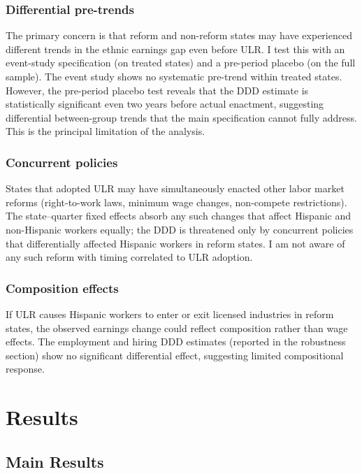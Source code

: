 \documentclass[12pt]{article}
\begin{document}
\subsubsection*{Differential pre-trends} The primary concern is that reform and non-reform states may have experienced different trends in the ethnic earnings gap even before ULR. I test this with an event-study specification (on treated states) and a pre-period placebo (on the full sample). The event study shows no systematic pre-trend within treated states. However, the pre-period placebo test reveals that the DDD estimate is statistically significant even two years before actual enactment, suggesting differential between-group trends that the main specification cannot fully address. This is the principal limitation of the analysis.

\subsubsection*{Concurrent policies} States that adopted ULR may have simultaneously enacted other labor market reforms (right-to-work laws, minimum wage changes, non-compete restrictions). The state--quarter fixed effects absorb any such changes that affect Hispanic and non-Hispanic workers equally; the DDD is threatened only by concurrent policies that differentially affected Hispanic workers in reform states. I am not aware of any such reform with timing correlated to ULR adoption.

\subsubsection*{Composition effects} If ULR causes Hispanic workers to enter or exit licensed industries in reform states, the observed earnings change could reflect composition rather than wage effects. The employment and hiring DDD estimates (reported in the robustness section) show no significant differential effect, suggesting limited compositional response.

\section{Results}

\subsection{Main Results}


\end{document}
